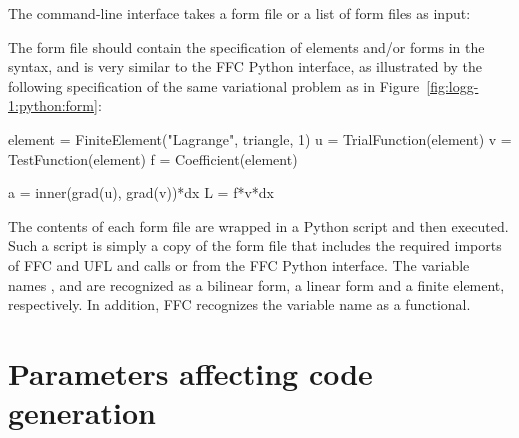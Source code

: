 The command-line interface takes a \ufl{} form file or a list of form
files as input:
The form file should contain the specification of elements and/or
forms in the~\ufl{} syntax, and is very similar to the FFC Python
interface, as illustrated by the following specification of the same
variational problem as in Figure~\ref{fig:logg-1:python:form}:
\begin{uflcode}
element = FiniteElement("Lagrange", triangle, 1)
u = TrialFunction(element)
v = TestFunction(element)
f = Coefficient(element)

a = inner(grad(u), grad(v))*dx
L = f*v*dx
\end{uflcode}
The contents of each form file are wrapped in a Python script
and then executed. Such a script is simply a copy of the form file
that includes the required imports of FFC and UFL and calls
 or  from the FFC
Python interface. The variable names , 
and  are recognized as a bilinear form, a linear form and
a finite element, respectively. In addition, FFC recognizes the
variable name  as a functional.

\section{Parameters affecting code generation}

